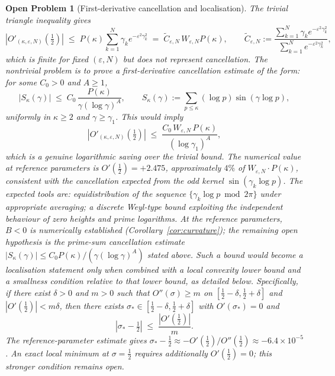 \documentclass[11pt]{article}
\newtheorem{openproblem}[theorem]{Open Problem}
\begin{document}
\begin{openproblem}[First-derivative cancellation and localisation]\label{op:stat}
The trivial triangle inequality gives
\[
|O'_{(\kappa,\varepsilon,N)}(\tfrac12)|
\;\le\;
P(\kappa)\sum_{k=1}^N\gamma_k e^{-\varepsilon^2\gamma_k^2}
\;=\;
\widetilde C_{\varepsilon,N}\,W_{\varepsilon,N}P(\kappa),
\qquad
\widetilde C_{\varepsilon,N}
:=\frac{\sum_{k=1}^N\gamma_k e^{-\varepsilon^2\gamma_k^2}}
       {\sum_{k=1}^N e^{-\varepsilon^2\gamma_k^2}},
\]
which is finite for fixed $(\varepsilon,N)$ but does not represent
cancellation. The nontrivial problem is to prove a first-derivative
\emph{cancellation estimate} of the form: for some $C_0>0$ and $A\ge1$,
\[
\bigl|S_\kappa(\gamma)\bigr|
\;\le\; C_0\,\frac{P(\kappa)}{\gamma(\log\gamma)^A},
\qquad
S_\kappa(\gamma):=\sum_{p\le\kappa}(\log p)\sin(\gamma\log p),
\]
uniformly in $\kappa\ge 2$ and $\gamma\ge\gamma_1$. This would imply
\[
|O'_{(\kappa,\varepsilon,N)}(\tfrac12)|
\;\le\;
\frac{C_0\,W_{\varepsilon,N}\,P(\kappa)}{(\log\gamma_1)^A},
\]
which is a genuine logarithmic saving over the trivial bound.
The numerical value at reference parameters is $O'(\tfrac12)=+2.475$,
approximately $4\%$ of $W_{\varepsilon,N}\cdot P(\kappa)$, consistent with the cancellation
expected from the odd kernel $\sin(\gamma_k\log p)$.
The expected tools are: equidistribution of the sequence
$\{\gamma_k\log p\bmod 2\pi\}$ under appropriate averaging; a discrete
Weyl-type bound exploiting the independent behaviour of zero heights
and prime logarithms.
At the reference parameters, $B<0$ is numerically established
(Corollary~\ref{cor:curvature}); the remaining open hypothesis is the
prime-sum cancellation estimate $|S_\kappa(\gamma)|\le C_0 P(\kappa)/(\gamma(\log\gamma)^A)$
stated above.
Such a bound would become a localisation statement only when combined
with a local convexity lower bound and a smallness condition relative
to that lower bound, as detailed below.
Specifically, if there exist $\delta>0$ and $m>0$ such that
$O''(\sigma)\ge m$ on $[\tfrac12-\delta,\tfrac12+\delta]$
and $|O'(\tfrac12)|<m\delta$, then there exists
$\sigma_*\in[\tfrac12-\delta,\tfrac12+\delta]$ with
$O'(\sigma_*)=0$ and
\[
|\sigma_* - \tfrac12| \;\le\; \frac{|O'(\tfrac12)|}{m}.
\]
The reference-parameter estimate gives
$\sigma_* - \tfrac12
\approx -O'(\tfrac12)/O''(\tfrac12) \approx -6.4\times10^{-5}$.
An exact local minimum at $\sigma=\tfrac12$ requires additionally
$O'(\tfrac12)=0$; this stronger condition remains open.
\end{openproblem}
\end{document}
